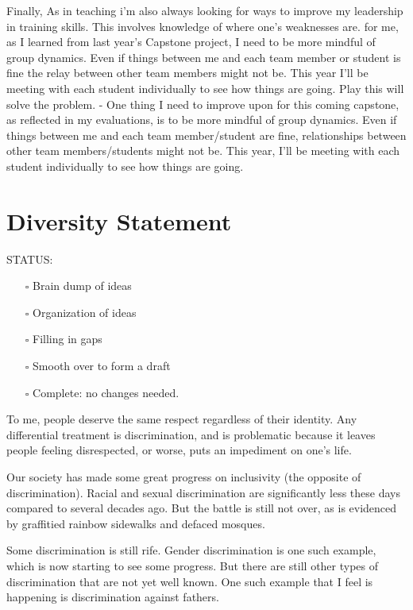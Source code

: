 \documentclass[]{article}
\providecommand{\tightlist}{%
  \setlength{\itemsep}{0pt}\setlength{\parskip}{0pt}}
\begin{document}
Finally, As in teaching i'm also always looking for ways to improve my leadership in training skills. This involves knowledge of where one's weaknesses are. for me, as I learned from last year's Capstone project, I need to be more mindful of group dynamics. Even if things between me and each team member or student is fine the relay between other team members might not be. This year I'll be meeting with each student individually to see how things are going. Play this will solve the problem. - One thing I need to improve upon for this coming capstone, as reflected in my evaluations, is to be more mindful of group dynamics. Even if things between me and each team member/student are fine, relationships between other team members/students might not be. This year, I'll be meeting with each student individually to see how things are going.

\hypertarget{diversity-statement}{%
\section{Diversity Statement}\label{diversity-statement}}

STATUS:

\begin{itemize}
\tightlist
\item[$\square$]
  Brain dump of ideas
\item[$\square$]
  Organization of ideas
\item[$\square$]
  Filling in gaps
\item[$\square$]
  Smooth over to form a draft
\item[$\square$]
  Complete: no changes needed.
\end{itemize}

To me, people deserve the same respect regardless of their identity. Any differential treatment is discrimination, and is problematic because it leaves people feeling disrespected, or worse, puts an impediment on one's life.

Our society has made some great progress on inclusivity (the opposite of discrimination). Racial and sexual discrimination are significantly less these days compared to several decades ago. But the battle is still not over, as is evidenced by graffitied rainbow sidewalks and defaced mosques.

Some discrimination is still rife. Gender discrimination is one such example, which is now starting to see some progress. But there are still other types of discrimination that are not yet well known. One such example that I feel is happening is discrimination against fathers.
\end{document}

